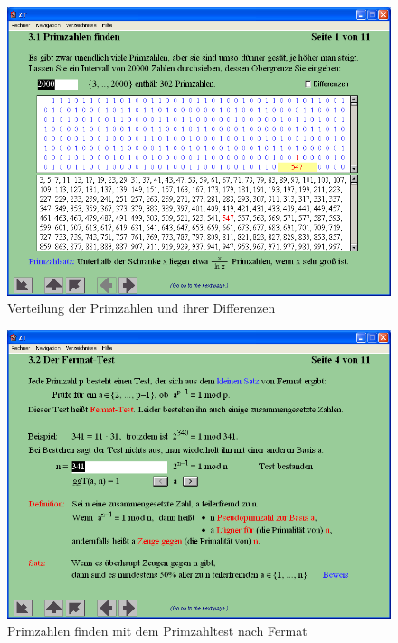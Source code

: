 \begin{refsegment}
\begin{figure}[ht]
\begin{center}
\includegraphics[scale=0.4]{figures/NT_Fig_C3-1_PrimesDistribution}
\caption{Verteilung der Primzahlen und ihrer Differenzen}
\label{NT_Fig_C3.1_PrimesDistribution}
\end{center}
\end{figure}


\begin{figure}[ht]
\begin{center}
\includegraphics[scale=0.4]{figures/NT_Fig_C3-2_Fermat-Test}
\caption{Primzahlen finden mit dem Primzahltest nach Fermat}
\label{NT_Fig_C3.2_Fermat-Test}
\end{center}
\end{figure}



\end{refsegment}

